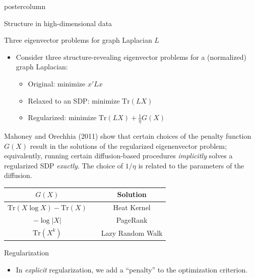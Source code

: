 \documentclass[final,hyperref={pdfpagelabels=false}]{beamer}
\begin{document}
\begin{frame}
\begin{columns}
\begin{column}{.49\textwidth}
\begin{beamercolorbox}[center,wd=\textwidth]{postercolumn}
\begin{minipage}[T]{.95\textwidth}
{\begin{block}{Structure in high-dimensional data}
            \end{block}

            \vfill

            \begin{block}{Three eigenvector problems for graph Laplacian $L$}
	    \begin{itemize}
	      \item Consider three structure-revealing eigenvector problems for a
	      (normalized) graph Laplacian:

              \begin{itemize}
              \item Original: minimize $x' L x$
              \item Relaxed to an SDP: minimize $\mathrm{Tr}(L X)$
              \item Regularized: minimize $\mathrm{Tr}(L X) + \tfrac{1}{\eta} G(X)$
              \end{itemize}
	      \end{itemize}

	      \vspace{1em}
	      Mahoney and Orechhia (2011) show that certain choices of the penalty
	      function $G(X)$ result in the solutions of the regularized
	      eigenenvector problem; equivalently, running certain
	      diffusion-based procedures \emph{implicitly} solves a
	      regularized SDP \emph{exactly}.  The choice of $1/\eta$ is
	      related to the parameters of the diffusion.

\begin{center}
    \begin{tabular}{ccc}
      $G(X)$ &\phantom{MMM} & Solution \\
      \hline
      $\mathrm{Tr}(X \log X) - \mathrm{Tr}(X)$ && Heat Kernel \\
      $- \log |X|$ && PageRank  \\
      $\mathrm{Tr}(X^k)$ && Lazy Random Walk
    \end{tabular}
\end{center}
	      
            \end{block}

	    \vfill

            \begin{block}{Regularization}
	      \begin{itemize}
	        \item In \emph{explicit} regularization, we add a ``penalty'' to the
		optimization criterion.


\end{itemize}
\end{block}}
\end{minipage}
\end{beamercolorbox}
\end{column}
\end{columns}
\end{frame}
\end{document}
